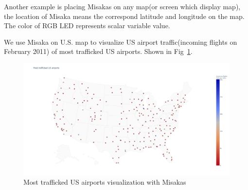 \documentclass[conference]{IEEEtran}
\begin{document}
Another example is placing Misakas on any map(or screen which display map), the location of Misaka means the correspond latitude and longitude on the map. The color of RGB LED represents scalar variable value.

We use Misaka on U.S. map to visualize US airport traffic(incoming flights on February 2011) of most trafficked US airports. Shown in Fig~\ref{fig:scatterplots2}.

\begin{figure}[htbp]
    \centering
    \includegraphics[width=\columnwidth]{scatterplots2.png}
    \caption{Most trafficked US airports visualization with Misakas}
    \label{fig:scatterplots2}
\end{figure}











\end{document}
